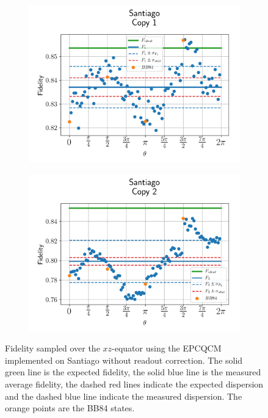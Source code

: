\begin{figure}[H]
  \centering
  \begin{subfigure}{.5\textwidth}
    \centering
    \includegraphics[width=\textwidth]{Figures/Economical/IBM/OnlyEquator/results_santiago_copy1.png}
    \label{fig:epc_uncorrected_santiago_equator_1}
  \end{subfigure}%
  \begin{subfigure}{.5\textwidth}
    \centering
    \includegraphics[width=\textwidth]{Figures/Economical/IBM/OnlyEquator/results_santiago_copy2.png}
    \label{fig:epc_uncorrected_santiago_equator_2}
  \end{subfigure}
  \vspace{-0.5cm}
  \caption{Fidelity sampled over the $xz$-equator using the EPCQCM implemented on Santiago without readout correction. The solid green line is the expected fidelity, the solid blue line is the measured average fidelity, the dashed red lines indicate the expected dispersion and the dashed blue line indicate the measured dispersion. The orange points are the BB84 states.}
  \label{fig:epc_uncorrected_santiago_equator}
\end{figure}

